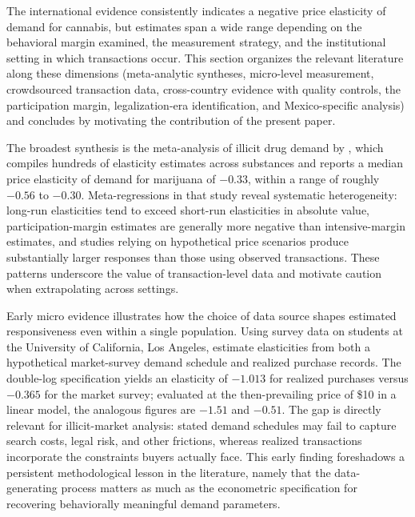 
The international evidence consistently indicates a negative price elasticity of demand for cannabis, but estimates span a wide range depending on the behavioral margin examined, the measurement strategy, and the institutional setting in which transactions occur.  This section organizes the relevant literature along these dimensions (meta-analytic syntheses, micro-level measurement, crowdsourced transaction data, cross-country evidence with quality controls, the participation margin, legalization-era identification, and Mexico-specific analysis) and concludes by motivating the contribution of the present paper.

The broadest synthesis is the meta-analysis of illicit drug demand by \citet{gallet2014monkey}, which compiles hundreds of elasticity estimates across substances and reports a median price elasticity of demand for marijuana of $-0.33$, within a range of roughly $-0.56$ to $-0.30$.  Meta-regressions in that study reveal systematic heterogeneity: long-run elasticities tend to exceed short-run elasticities in absolute value, participation-margin estimates are generally more negative than intensive-margin estimates, and studies relying on hypothetical price scenarios produce substantially larger responses than those using observed transactions.  These patterns underscore the value of transaction-level data and motivate caution when extrapolating across settings.

Early micro evidence illustrates how the choice of data source shapes estimated responsiveness even within a single population.  Using survey data on students at the University of California, Los Angeles, \citet{nisbet1972ucla} estimate elasticities from both a hypothetical market-survey demand schedule and realized purchase records.  The double-log specification yields an elasticity of $-1.013$ for realized purchases versus $-0.365$ for the market survey; evaluated at the then-prevailing price of \$10 in a linear model, the analogous figures are $-1.51$ and $-0.51$.  The gap is directly relevant for illicit-market analysis: stated demand schedules may fail to capture search costs, legal risk, and other frictions, whereas realized transactions incorporate the constraints buyers actually face.  This early finding foreshadows a persistent methodological lesson in the literature, namely that the data-generating process matters as much as the econometric specification for recovering behaviorally meaningful demand parameters.

